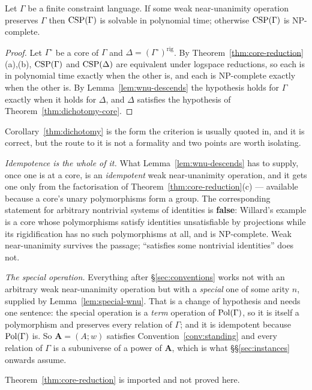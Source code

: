 \begin{corollary}\label{thm:dichotomy}
Let $\Gamma$ be a finite constraint language. If some weak near-unanimity
operation preserves $\Gamma$ then $\operatorname{CSP}(\Gamma)$ is solvable in polynomial
time; otherwise $\operatorname{CSP}(\Gamma)$ is \textup{NP}-complete.
\end{corollary}

\begin{proof}
Let $\Gamma^{\circ}$ be a core of $\Gamma$ and
$\Delta=(\Gamma^{\circ})^{\mathrm{rig}}$. By
Theorem~\ref{thm:core-reduction}(a),(b), $\operatorname{CSP}(\Gamma)$ and $\operatorname{CSP}(\Delta)$ are
equivalent under logspace reductions, so each is in polynomial time exactly
when the other is, and each is \textup{NP}-complete exactly when the other is.
By Lemma~\ref{lem:wnu-descends} the hypothesis holds for $\Gamma$ exactly when
it holds for $\Delta$, and $\Delta$ satisfies the hypothesis of
Theorem~\ref{thm:dichotomy-core}.
\end{proof}

\begin{hazard}\label{haz:core}
Corollary~\ref{thm:dichotomy} is the form the criterion is usually quoted in,
and it is correct, but the route to it is not a formality and two points are
worth isolating.

\emph{Idempotence is the whole of it.} What
Lemma~\ref{lem:wnu-descends} has to supply, once one is at a core, is an
\emph{idempotent} weak near-unanimity operation, and it gets one only from the
factorisation of Theorem~\ref{thm:core-reduction}(c) --- available because a
core's unary polymorphisms form a group. The corresponding statement for
arbitrary nontrivial systems of identities is \textbf{false}: Willard's example
\cite[Ex.~1.4.5]{BradyNotes} is a core whose polymorphisms satisfy identities
unsatisfiable by projections while its rigidification has no such
polymorphisms at all, and is \textup{NP}-complete. Weak near-unanimity survives
the passage; ``satisfies some nontrivial identities'' does not.

\emph{The special operation.} Everything after \S\ref{sec:conventions} works
not with an arbitrary weak near-unanimity operation but with a \emph{special}
one of some arity $n$, supplied by Lemma~\ref{lem:special-wnu}. That is a
change of hypothesis and needs one sentence: the special operation is a
\emph{term} operation of $\operatorname{Pol}(\Gamma)$, so it is itself a polymorphism and
preserves every relation of $\Gamma$; and it is idempotent because
$\operatorname{Pol}(\Gamma)$ is. So $\mathbf A=(A;w)$ satisfies
Convention~\ref{conv:standing} and every relation of $\Gamma$ is a subuniverse
of a power of $\mathbf A$, which is what \S\S\ref{sec:instances} onwards
assume.

Theorem~\ref{thm:core-reduction} is imported and not proved here.
\end{hazard}

